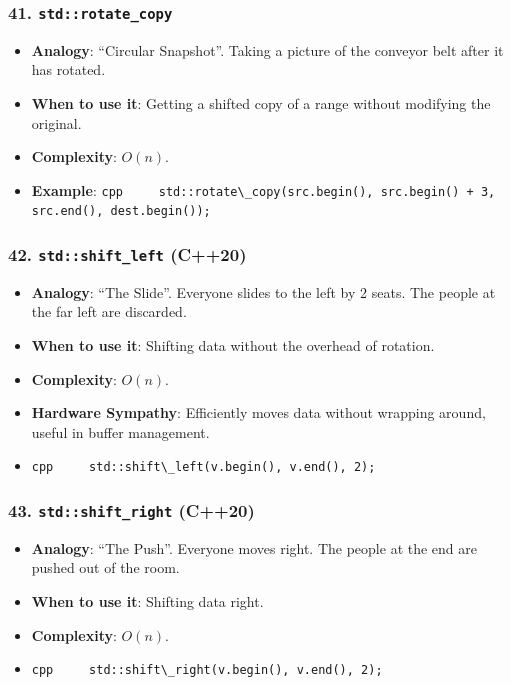 \hypertarget{stdrotate_copy}{%
\subsubsection{\texorpdfstring{41.
\texttt{std::rotate\_copy}}{41. std::rotate\_copy}}\label{stdrotate_copy}}

\begin{itemize}
\tightlist
\item
  \textbf{Analogy}: ``Circular Snapshot''. Taking a picture of the
  conveyor belt after it has rotated.
\item
  \textbf{When to use it}: Getting a shifted copy of a range without
  modifying the original.
\item
  \textbf{Complexity}: \(O(n)\).
\item
  \textbf{Example}:
  \passthrough{\lstinline!cpp     std::rotate\_copy(src.begin(), src.begin() + 3, src.end(), dest.begin());!}
\end{itemize}

\hypertarget{stdshift_left-c20}{%
\subsubsection{\texorpdfstring{42. \texttt{std::shift\_left}
(C++20)}{42. std::shift\_left (C++20)}}\label{stdshift_left-c20}}

\begin{itemize}
\tightlist
\item
  \textbf{Analogy}: ``The Slide''. Everyone slides to the left by 2
  seats. The people at the far left are discarded.
\item
  \textbf{When to use it}: Shifting data without the overhead of
  rotation.
\item
  \textbf{Complexity}: \(O(n)\).
\item
  \textbf{Hardware Sympathy}: Efficiently moves data without wrapping
  around, useful in buffer management.
\item
  \passthrough{\lstinline!cpp     std::shift\_left(v.begin(), v.end(), 2);!}
\end{itemize}

\hypertarget{stdshift_right-c20}{%
\subsubsection{\texorpdfstring{43. \texttt{std::shift\_right}
(C++20)}{43. std::shift\_right (C++20)}}\label{stdshift_right-c20}}

\begin{itemize}
\tightlist
\item
  \textbf{Analogy}: ``The Push''. Everyone moves right. The people at
  the end are pushed out of the room.
\item
  \textbf{When to use it}: Shifting data right.
\item
  \textbf{Complexity}: \(O(n)\).
\item
  \passthrough{\lstinline!cpp     std::shift\_right(v.begin(), v.end(), 2);!}
\end{itemize}

